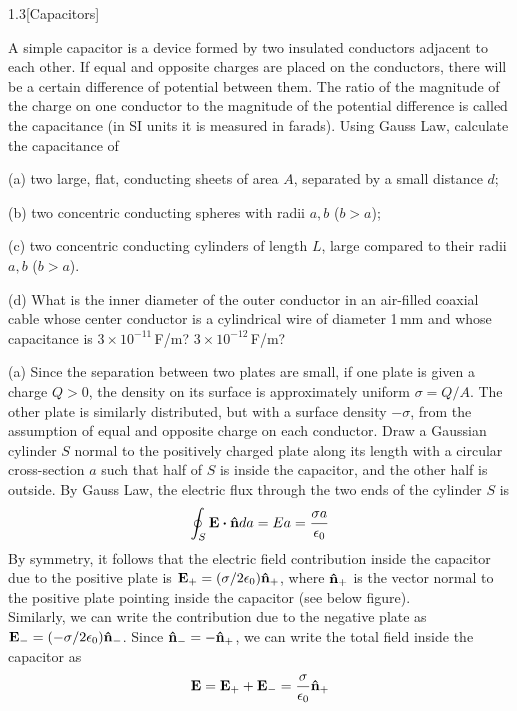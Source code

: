 \documentclass[12pt]{article}
\begin{document}
\begin{problem}{1.3}[Capacitors]

A simple capacitor is a device formed by two insulated conductors adjacent to
each other. If equal and opposite charges are placed on the conductors, there
will be a certain difference of potential between them. The ratio of the
magnitude of the charge on one conductor to the magnitude of the potential
difference is called the capacitance (in SI units it is measured in farads).
Using Gauss Law, calculate the capacitance of

(a) two large, flat, conducting sheets of area $A$, separated by a small
distance $d$;

(b) two concentric conducting spheres with radii $a,b$ ($b>a$);

(c) two concentric conducting cylinders of length $L$, large compared to their
radii $a,b$ ($b>a$).

(d) What is the inner diameter of the outer conductor in an air-filled coaxial
cable whose center conductor is a cylindrical wire of diameter 1\,\si{mm} and
whose capacitance is $3\times10^{-11}$\,\si{F/m}? $3\times10^{-12}$\,\si{F/m}?

\begin{solution}
   
    (a) Since the separation between two plates are small, if one plate is given
    a charge $Q>0$, the density on its surface is approximately uniform
    $\sigma=Q/A$. The other plate is similarly distributed, but with a surface
    density $-\sigma$, from the assumption of equal and opposite charge on each
    conductor. Draw a Gaussian cylinder $S$ normal to the positively charged 
    plate  along its length with a circular cross-section $a$ such that half of 
    $S$ is inside the capacitor, and the other half is outside. By Gauss Law, 
    the electric flux through the two ends of the cylinder $S$ is
    \begin{equation}
        \oint_S\vb{E}\vdot\nhat da=Ea=\frac{\sigma a}{\epsilon_0}
    \end{equation}
    By symmetry, it follows that the electric field contribution inside the 
    capacitor due to the positive plate is
    $\vb{E}_+=(\sigma/2\epsilon_0)\vb{\hat{n}}_+$, where $\vb{\hat{n}}_+$
    is the vector normal to the positive plate pointing inside the capacitor
    (see below figure). \\[2in]

    Similarly, we can write the contribution due to the negative plate as
    $\vb{E}_-=(-\sigma/2\epsilon_0)\vb{\hat{n}}_-$. Since $\vb{\hat{n}}_-=-\vb{\hat{n}}_+$, we can
    write the total field inside the capacitor as
    \begin{equation}
        \vb{E}=\vb{E}_++\vb{E}_-=\frac{\sigma}{\epsilon_0}\vb{\hat{n}}_+ 
    \end{equation}
    

\end{solution}
\end{problem}
\end{document}
